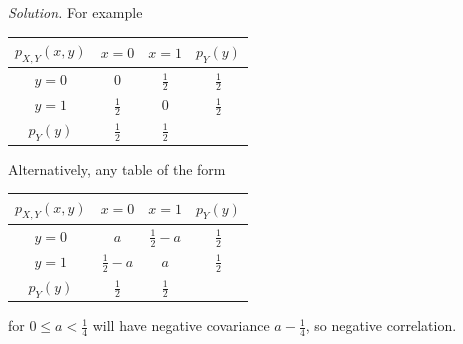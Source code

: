 \documentclass[
  a4paper,
]{book}
\theoremstyle{definition}
\theoremstyle{definition}
\theoremstyle{definition}
\theoremstyle{definition}
\theoremstyle{remark}
\begin{document}
\begin{myanswers}
\emph{Solution.} For example

\begin{longtable}[]{@{}cccc@{}}
\toprule\noalign{}
\(p_{X,Y}(x,y)\) & \(x = 0\) & \(x = 1\) & \(p_Y(y)\) \\
\midrule\noalign{}
\endhead
\bottomrule\noalign{}
\endlastfoot
\(y = 0\) & \(0\) & \(\frac12\) & \(\frac12\) \\
\(y = 1\) & \(\frac12\) & \(0\) & \(\frac12\) \\
\(p_Y(y)\) & \(\frac12\) & \(\frac12\) & \\
\end{longtable}

Alternatively, any table of the form

\begin{longtable}[]{@{}cccc@{}}
\toprule\noalign{}
\(p_{X,Y}(x,y)\) & \(x = 0\) & \(x = 1\) & \(p_Y(y)\) \\
\midrule\noalign{}
\endhead
\bottomrule\noalign{}
\endlastfoot
\(y = 0\) & \(a\) & \(\frac12 - a\) & \(\frac12\) \\
\(y = 1\) & \(\frac12 - a\) & \(a\) & \(\frac12\) \\
\(p_Y(y)\) & \(\frac12\) & \(\frac12\) & \\
\end{longtable}

for \(0 \leq a < \frac14\) will have negative covariance \(a - \frac14\), so negative correlation.

\end{myanswers}
\end{document}
